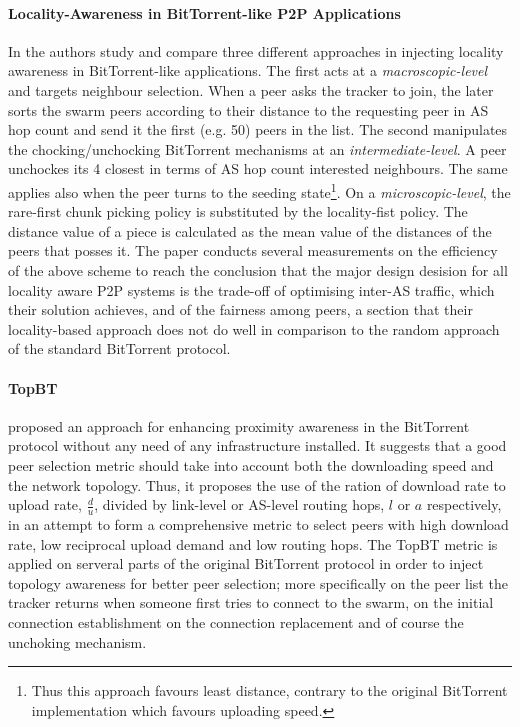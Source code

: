\paragraph*{\bf Locality-Awareness in BitTorrent-like P2P Applications}
In \cite{lclx_bitlocal_2009} the authors study and compare three different
approaches in injecting locality awareness in BitTorrent-like applications. The
first acts at a \emph{macroscopic-level} and targets neighbour selection. When a
peer asks the tracker to join, the later sorts the swarm peers according to
their distance to the requesting peer in AS hop count and send it the first
(e.g. 50) peers in the list. The second manipulates the chocking/unchocking
BitTorrent mechanisms at an \emph{intermediate-level}. A peer unchockes its 4
closest in terms of AS hop count interested neighbours. The same applies also
when the peer turns to the seeding state\footnote{Thus this approach favours
least distance, contrary to the original BitTorrent implementation which favours
uploading speed.}. On a \emph{microscopic-level}, the rare-first chunk picking
policy is substituted by the locality-fist policy. The distance value of a piece
is calculated as the mean value of the distances of the peers that posses it.
The paper conducts several measurements on the efficiency of the above scheme to
reach the conclusion that the major design desision for all locality aware P2P
systems is the trade-off of optimising inter-AS traffic, which their solution
achieves, and of the fairness among peers, a section that their locality-based
approach does not do well in comparison to the random approach of the standard
BitTorrent protocol.

\paragraph*{\bf TopBT}
\cite{rtlcgz_topbt_2010} proposed an approach for enhancing proximity awareness
in the BitTorrent protocol without any need of any infrastructure installed. It
suggests that a good peer selection metric should take into account both the
downloading speed and the network topology. Thus, it proposes the use of the
ration of download rate to upload rate, $\frac{d}{u}$, divided by link-level or
AS-level routing hops, $l$ or $a$ respectively, in an attempt to form a
comprehensive metric to select peers with high download rate, low reciprocal
upload demand and low routing hops. The TopBT metric is applied on serveral
parts of the original BitTorrent protocol in order to inject topology awareness
for better peer selection; more specifically on the peer list the tracker
returns when someone first tries to connect to the swarm, on the initial
connection establishment on the connection replacement and of course the
unchoking mechanism.

